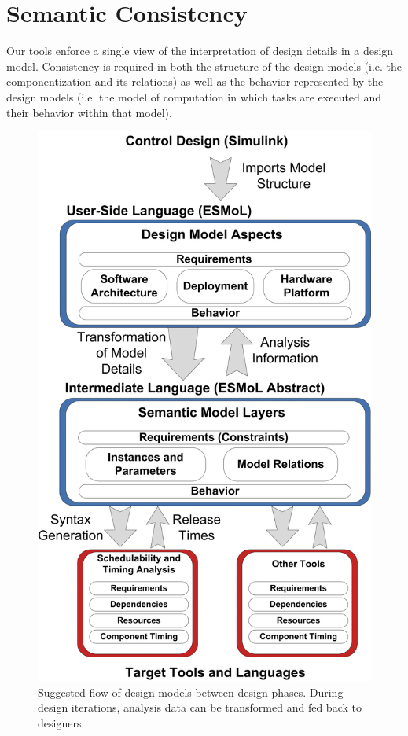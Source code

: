 \section{Semantic Consistency}

Our tools enforce a single view of the interpretation of design details in a design model.  
Consistency is required in both the structure of the design models (i.e. the componentization 
and its relations) as well as the behavior represented by the design models (i.e. the model of 
computation in which tasks are executed and their behavior within that model). 

\begin{figure}
\centering
\includegraphics[width=0.72\columnwidth]{figures/designflow.png}
    \caption{Suggested flow of design models between design phases. During design iterations, 
analysis data can be transformed and fed back to designers. }
    \label{fig:designflow}
\end{figure}

